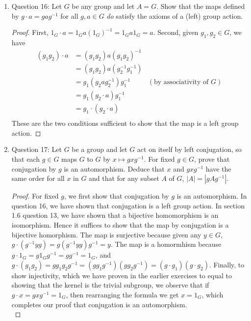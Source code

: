 \documentclass{article}
\begin{document}
\begin{enumerate}
\begin{enumerate}
      \item Question 16: Let $G$ be any group and let $A=G$. Show that the
        maps defined by $g\cdot a=gag^{-1}$ for all $g,a\in G$ \textit{do}
        satisfy the axioms of a (left) group action.

        \begin{proof}
          First, $1_G\cdot a=1_Ga(1_G)^{-1}=1_Ga1_G=a$. Second, given
          $g_1,g_2\in G$, we have
          \begin{align*}
            (g_1g_2)\cdot a & = (g_1g_2)a(g_1g_2)^{-1}      & \\
                            & = (g_1g_2)a(g_2^{-1}g_1^{-1}) & \\
                            & = g_1(g_2ag_2^{-1})g_1^{-1}   & (\text{by
                            associativity of $G$}) \\
                            & = g_1(g_2\cdot a)g_1^{-1}     & \\
                            & = g_1\cdot(g_2\cdot a)        & \\
          \end{align*}
          These are the two conditions sufficient to show that the map is a
          left group action. 
        \end{proof}

      \item Question 17: Let $G$ be a group and let $G$ act on itself by
        left conjugation, so that each $g\in G$ maps $G$ to $G$ by
        $x\mapsto gxg^{-1}$. For fixed $g\in G$, prove that conjugation by
        $g$ is an automorphism. Deduce that $x$ and $gxg^{-1}$ have the same
        order for all $x$ in $G$ and that for any subset $A$ of $G$,
        $|A|=|gAg^{-1}|$.

        \begin{proof}
          For fixed $g$, we first show that conjugation by $g$ is an
          automorphism. In question 16, we have shown that conjugation is a
          left group action. In section 1.6 question 13, we have shown that
          a bijective homomorphism is an isomorphism. Hence it suffices to
          show that the map by conjugation is a bijective homorphism. The
          map is surjective because given any $y\in G$, $g\cdot
          (g^{-1}yg)=g(g^{-1}yg)g^{-1}=y$. The map is a homormhism because
          $g\cdot 1_G=g1_Gg^{-1}=gg^{-1}=1_G$, and
          $g\cdot(g_1g_2)=gg_1g_2g^{-1}=(gg_1g^{-1})(gg_2g^{-1})=(g\cdot
          g_1)(g\cdot g_2)$. Finally, to show injectivity, which we have
          proven in the earlier exercises to equal to showing that the
          kernel is the trivial subgroup, we observe that if $g\cdot
          x=gxg^{-1}=1_G$, then rearranging the formula we get $x=1_G$,
          which completes our proof that conjugation is an automorphism. \\


\end{proof}
\end{enumerate}
\end{enumerate}
\end{document}
